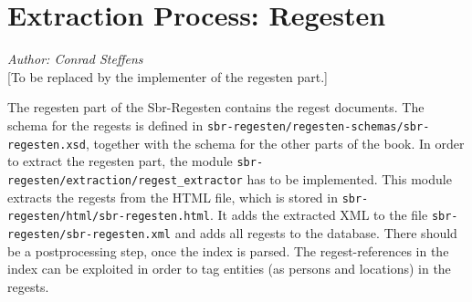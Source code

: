 \section{Extraction Process: Regesten}
\label{sec:regesten}

\emph{Author: Conrad Steffens} \\

[To be replaced by the implementer of the regesten part.]

The regesten part of the Sbr-Regesten contains the regest documents. The schema for the regests is defined in \texttt{sbr-regesten/regesten-schemas/sbr-regesten.xsd}, together with the schema for the other parts of the book. In order to extract the regesten part, the module \texttt{sbr-regesten/extraction/regest\_extractor} has to be implemented. This module extracts the regests from the HTML file, which is stored in \texttt{sbr-regesten/html/sbr-regesten.html}. It adds the extracted XML to the file \texttt{sbr-regesten/sbr-regesten.xml} and adds all regests to the database. There should be a postprocessing step, once the index is parsed. The regest-references in the index can be exploited in order to tag entities (as persons and locations) in the regests.